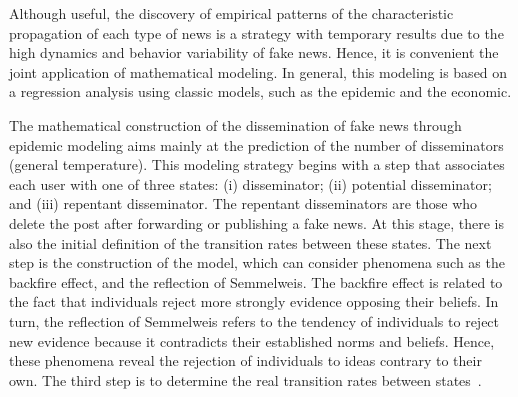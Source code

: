 \documentclass{ieeeaccess}
\begin{document}

Although useful, the discovery of empirical patterns of the characteristic propagation of each type of news is a strategy with temporary results due to the high dynamics and behavior variability of fake news. Hence, it is convenient the joint application of mathematical modeling. In general, this modeling is based on a regression analysis using classic models, such as the epidemic and the economic.


The mathematical construction of the dissemination of fake news through epidemic modeling aims mainly at the prediction of the number of disseminators (general temperature). This modeling strategy begins with a step that associates each user with one of three states: (i) disseminator; (ii) potential disseminator; and (iii) repentant disseminator. The repentant disseminators are those who delete the post after forwarding or publishing a fake news. At this stage, there is also the initial definition of the transition rates between these states. The next step is the construction of the model, which can consider phenomena such as the backfire effect, and the reflection of Semmelweis. The backfire effect is related to the fact that individuals reject more strongly evidence opposing their beliefs. In turn, the reflection of Semmelweis refers to the tendency of individuals to reject new evidence because it contradicts their established norms and beliefs. Hence, these phenomena reveal the rejection of individuals to ideas contrary to their own. The third step is to determine the real transition rates between states~\cite{zhou2018fake}.
\end{document}
